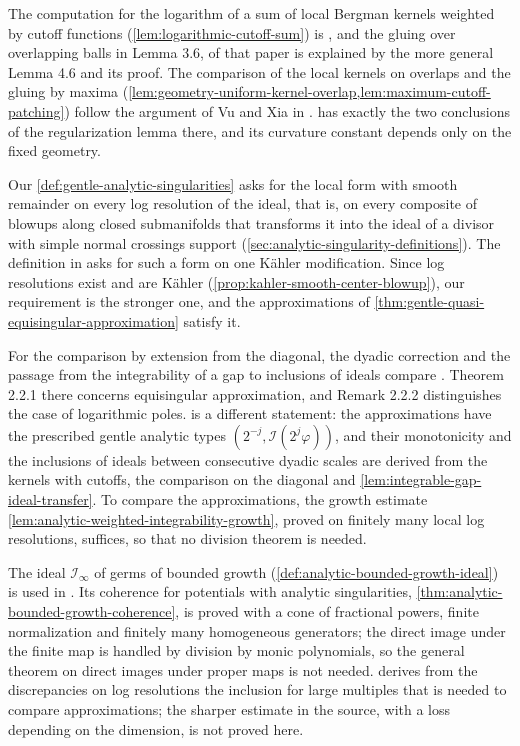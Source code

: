 The computation for the logarithm of a sum of local Bergman kernels weighted by cutoff functions (\cref{lem:logarithmic-cutoff-sum}) is \cite[Lemma 3.5]{DemRegOnline}, and the gluing over overlapping balls in Lemma 3.6, of that paper is explained by the more general Lemma 4.6 and its proof. The comparison of the local kernels on overlaps and the gluing by maxima (\cref{lem:geometry-uniform-kernel-overlap,lem:maximum-cutoff-patching}) follow the argument of Vu and Xia in \cite[Lemmas \texttt{patching} and \texttt{regularization}]{VuXiaNakamaye}.  has exactly the two conclusions of the regularization lemma there, and its curvature constant depends only on the fixed geometry.

Our \cref{def:gentle-analytic-singularities} asks for the local form with smooth remainder on every log resolution of the ideal, that is, on every composite of blowups along closed submanifolds that transforms it into the ideal of a divisor with simple normal crossings support (\cref{sec:analytic-singularity-definitions}). The definition in \cite[Chapter on plurisubharmonic functions, definition of gentle analytic singularities]{XiaSampleBook} asks for such a form on one K\"ahler modification. Since log resolutions exist and are K\"ahler (\cref{prop:kahler-smooth-center-blowup}), our requirement is the stronger one, and the approximations of \cref{thm:gentle-quasi-equisingular-approximation} satisfy it.

For the comparison by extension from the diagonal, the dyadic correction and the passage from the integrability of a gap to inclusions of ideals compare \cite[Section 2.2, Steps 2--3]{DPS01}. Theorem 2.2.1 there concerns equisingular approximation, and Remark 2.2.2 distinguishes the case of logarithmic poles.  is a different statement: the approximations have the prescribed gentle analytic types $(2^{-j},\mathcal I(2^j\varphi))$, and their monotonicity and the inclusions of ideals between consecutive dyadic scales are derived from the kernels with cutoffs, the comparison on the diagonal and \cref{lem:integrable-gap-ideal-transfer}. To compare the approximations, the growth estimate \cref{lem:analytic-weighted-integrability-growth}, proved on finitely many local log resolutions, suffices, so that no division theorem is needed.

The ideal $\mathcal I_\infty$ of germs of bounded growth (\cref{def:analytic-bounded-growth-ideal}) is used in \cite[Chapter on plurisubharmonic functions, the lemma following the definition of $\mathcal I_\infty$ and Lemma 1.6.3]{XiaSampleBook}. Its coherence for potentials with analytic singularities, \cref{thm:analytic-bounded-growth-coherence}, is proved with a cone of fractional powers, finite normalization and finitely many homogeneous generators; the direct image under the finite map is handled by division by monic polynomials, so the general theorem on direct images under proper maps is not needed.  derives from the discrepancies on log resolutions the inclusion for large multiples that is needed to compare approximations; the sharper estimate in the source, with a loss depending on the dimension, is not proved here.

